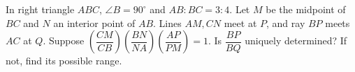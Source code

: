 In right triangle $ABC$, $\angle B=90^\circ$ and $AB:BC=3:4$. Let $M$ be the midpoint of $BC$ and $N$ an interior point of $AB$. Lines $AM,CN$ meet at $P$, and ray $BP$ meets $AC$ at $Q$. Suppose $(\dfrac{CM}{CB})(\dfrac{BN}{NA})(\dfrac{AP}{PM})=1$. Is $\dfrac{BP}{BQ}$ uniquely determined? If not, find its possible range.
